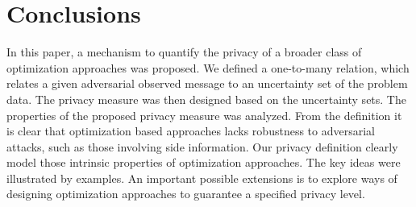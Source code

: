 \documentclass[12pt,draftcls,onecolumn]{IEEEtran}
\newcommand{\addnew}[1]{{{\color{blue!0!black}#1}}}
\begin{document}
\section{Conclusions}\label{sec:conclusions}
\addnew{
In this paper, a mechanism to quantify the privacy of a broader class of optimization approaches was proposed. We defined a one-to-many relation, which relates a given adversarial observed message to an uncertainty set of the problem data. The privacy measure was then designed based on the uncertainty sets. The properties of the proposed privacy measure was analyzed. From the definition it is clear that optimization based approaches lacks robustness to adversarial attacks, such as those involving side information. Our privacy definition clearly model those intrinsic properties of optimization approaches. The key ideas were illustrated by examples. An important possible extensions is to explore ways of designing optimization approaches to guarantee a specified privacy level.







}





\end{document}
